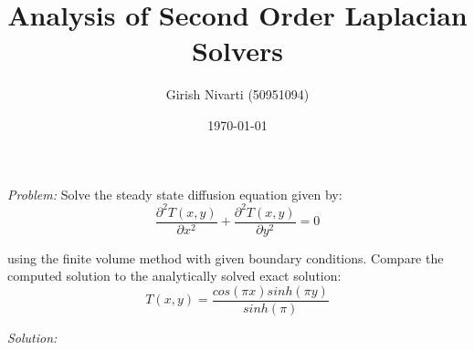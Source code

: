 \documentclass[a4paper,10pt]{article}
\title{Analysis of Second Order Laplacian Solvers}
\author{Girish Nivarti (50951094)}
\date{\today}
\begin{document}
\maketitle

\emph{Problem:} Solve the steady state diffusion equation given by:
\begin{equation}
  \frac{\partial^2 T(x,y)}{\partial x^2} +   \frac{\partial^2 T(x,y)}{\partial y^2} = 0 
\end{equation}

using the finite volume method with given boundary conditions.
Compare the computed solution to the analytically solved exact solution:
\begin{equation}
  T(x,y) = \frac{cos(\pi x) sinh(\pi y)}{sinh(\pi)}
\end{equation}


\emph{Solution:} 
\end{document}
